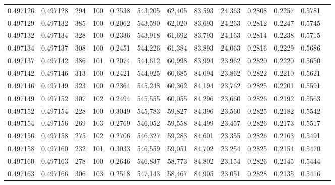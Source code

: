 \begin{tabular}{rrrrrrrrrrrrr}
0.497126 & 0.497128 &   294 & 100 &                                     0.2538 & 543,205 &  62,405 &  83,593 &  24,363 & 0.2808 & 0.2257 & 0.5781 \\
0.497129 & 0.497132 &   385 & 100 &                                     0.2062 & 543,590 &  62,020 &  83,693 &  24,263 & 0.2812 & 0.2247 & 0.5745 \\
0.497132 & 0.497134 &   328 & 100 &                                     0.2336 & 543,918 &  61,692 &  83,793 &  24,163 & 0.2814 & 0.2238 & 0.5715 \\
0.497134 & 0.497137 &   308 & 100 &                                     0.2451 & 544,226 &  61,384 &  83,893 &  24,063 & 0.2816 & 0.2229 & 0.5686 \\
0.497137 & 0.497142 &   386 & 101 &                                     0.2074 & 544,612 &  60,998 &  83,994 &  23,962 & 0.2820 & 0.2220 & 0.5650 \\
0.497142 & 0.497146 &   313 & 100 &                                     0.2421 & 544,925 &  60,685 &  84,094 &  23,862 & 0.2822 & 0.2210 & 0.5621 \\
0.497146 & 0.497149 &   323 & 100 &                                     0.2364 & 545,248 &  60,362 &  84,194 &  23,762 & 0.2825 & 0.2201 & 0.5591 \\
0.497149 & 0.497152 &   307 & 102 &                                     0.2494 & 545,555 &  60,055 &  84,296 &  23,660 & 0.2826 & 0.2192 & 0.5563 \\
0.497152 & 0.497154 &   228 & 100 &                                     0.3049 & 545,783 &  59,827 &  84,396 &  23,560 & 0.2825 & 0.2182 & 0.5542 \\
0.497154 & 0.497156 &   269 & 103 &                                     0.2769 & 546,052 &  59,558 &  84,499 &  23,457 & 0.2826 & 0.2173 & 0.5517 \\
0.497156 & 0.497158 &   275 & 102 &                                     0.2706 & 546,327 &  59,283 &  84,601 &  23,355 & 0.2826 & 0.2163 & 0.5491 \\
0.497158 & 0.497160 &   232 & 101 &                                     0.3033 & 546,559 &  59,051 &  84,702 &  23,254 & 0.2825 & 0.2154 & 0.5470 \\
0.497160 & 0.497163 &   278 & 100 &                                     0.2646 & 546,837 &  58,773 &  84,802 &  23,154 & 0.2826 & 0.2145 & 0.5444 \\
0.497163 & 0.497166 &   306 & 103 &                                     0.2518 & 547,143 &  58,467 &  84,905 &  23,051 & 0.2828 & 0.2135 & 0.5416 \\

\end{tabular}
